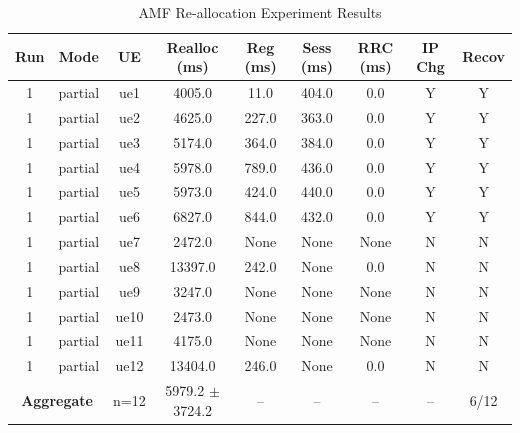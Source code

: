 \begin{table}[ht]
\centering
\begin{tabular}{|c|c|c|c|c|c|c|c|c|}
\hline
Run & Mode & UE & Realloc (ms) & Reg (ms) & Sess (ms) & RRC (ms) & IP Chg & Recov \\
\hline
1 & partial & ue1 & 4005.0 & 11.0 & 404.0 & 0.0 & Y & Y \\
1 & partial & ue2 & 4625.0 & 227.0 & 363.0 & 0.0 & Y & Y \\
1 & partial & ue3 & 5174.0 & 364.0 & 384.0 & 0.0 & Y & Y \\
1 & partial & ue4 & 5978.0 & 789.0 & 436.0 & 0.0 & Y & Y \\
1 & partial & ue5 & 5973.0 & 424.0 & 440.0 & 0.0 & Y & Y \\
1 & partial & ue6 & 6827.0 & 844.0 & 432.0 & 0.0 & Y & Y \\
1 & partial & ue7 & 2472.0 & None & None & None & N & N \\
1 & partial & ue8 & 13397.0 & 242.0 & None & 0.0 & N & N \\
1 & partial & ue9 & 3247.0 & None & None & None & N & N \\
1 & partial & ue10 & 2473.0 & None & None & None & N & N \\
1 & partial & ue11 & 4175.0 & None & None & None & N & N \\
1 & partial & ue12 & 13404.0 & 246.0 & None & 0.0 & N & N \\
\multicolumn{2}{|c|}{\textbf{Aggregate}} & n=12 & 5979.2 $\pm$ 3724.2 & -- & -- & -- & -- & 6/12 \\
\hline
\end{tabular}
\caption{AMF Re-allocation Experiment Results}
\label{tab:amf_realloc}
\end{table}
